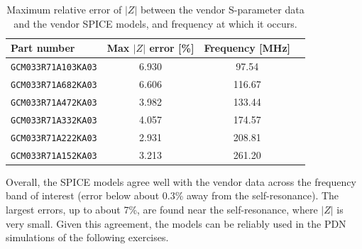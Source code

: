 \begin{table}[!h]
\centering
\caption{Maximum relative error of $|Z|$ between the vendor S-parameter data and the vendor SPICE models, and frequency at which it occurs.}
\label{tab:cap_val_err}
\begin{tabular}{lccc}
\hline
\textbf{Part number} & \textbf{Max $|Z|$ error [\%]} & \textbf{Frequency [MHz]} \\
\hline
\texttt{GCM033R71A103KA03} & 6.930 &  97.54   \\
\texttt{GCM033R71A682KA03} & 6.606 & 116.67   \\
\texttt{GCM033R71A472KA03} & 3.982 & 133.44   \\
\texttt{GCM033R71A332KA03} & 4.057 & 174.57   \\
\texttt{GCM033R71A222KA03} & 2.931 & 208.81   \\
\texttt{GCM033R71A152KA03} & 3.213 & 261.20   \\
\hline
\end{tabular}
\end{table}

\noindent Overall, the SPICE models agree well with the vendor data across the
frequency band of interest (error below about 0.3\% away from the
self-resonance). The largest errors, up to about 7\%, are found near the
self-resonance, where $|Z|$ is very small. Given this agreement, the models
can be reliably used in the PDN simulations of the following exercises.